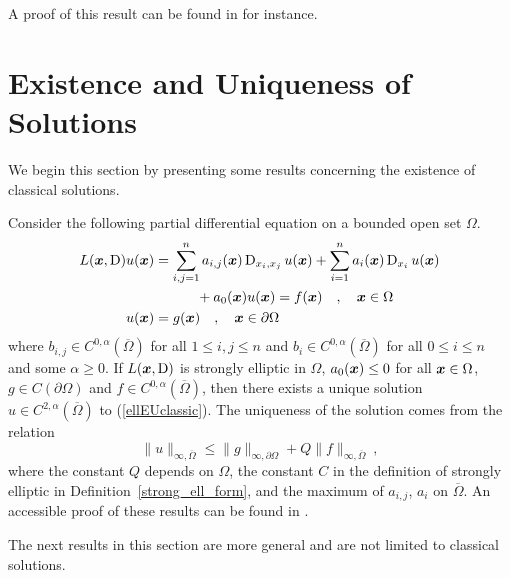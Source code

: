 A proof of this result can be found in \cite{FoPDE} for instance.

\section{Existence and Uniqueness of Solutions}

We begin this section by presenting some results concerning the
existence of classical solutions.

Consider the following partial differential equation on a bounded
open set $\Omega$.
\begin{equation} \label{ellEUclassic}
\begin{split}
L({\bm{x}}, \operatorname{D})u({\bm{x}})
&= \sum_{i,j=1}^n a_{i,j}({\bm{x}}) \operatorname{D}_{x_i,x_j} u({\bm{x}})
+ \sum_{i=1}^n a_i({\bm{x}}) \operatorname{D}_{x_i} u({\bm{x}}) \\
& \qquad \quad + a_0({\bm{x}})u({\bm{x}}) = f({\bm{x}})
\quad , \quad {\bm{x}} \in \Omega \\
u({\bm{x}}) &= g({\bm{x}}) \quad , \quad {\bm{x}} \in \partial \Omega
\end{split}
\end{equation}
where $\displaystyle b_{i,j} \in C^{0,\alpha}(\overline{\Omega})$ for
all $1\leq i, j \leq n$ and
$\displaystyle b_i \in C^{0,\alpha}(\overline{\Omega})$ for all
$0 \leq i \leq n$ and some $\alpha \geq 0$.  If $L({\bm{x}},\operatorname{D})$ is
strongly elliptic in $\Omega$, $a_0({\bm{x}}) \leq 0$ for all
${\bm{x}} \in \Omega$, $g \in C(\partial \Omega)$ and
$\displaystyle f \in C^{0,\alpha}(\overline{\Omega})$,
then there exists a unique solution
$\displaystyle u \in C^{2,\alpha}(\overline{\Omega})$
to (\ref{ellEUclassic}).  The uniqueness of the solution comes from
the relation
\[
  \|u\|_{\infty,\overline{\Omega}} \leq \|g\|_{\infty,\partial \Omega}
  + Q \|f\|_{\infty,\overline{\Omega}} \ ,
\]
where the constant $Q$ depends on $\Omega$, the constant $C$ in the
definition of strongly elliptic in Definition~\ref{strong_ell_form},
and the maximum of $a_{i,j}$, $a_i$ on $\overline{\Omega}$.
An accessible proof of these results can be found in \cite{Smo}.

The next results in this section are more general and are not limited to
classical solutions.

